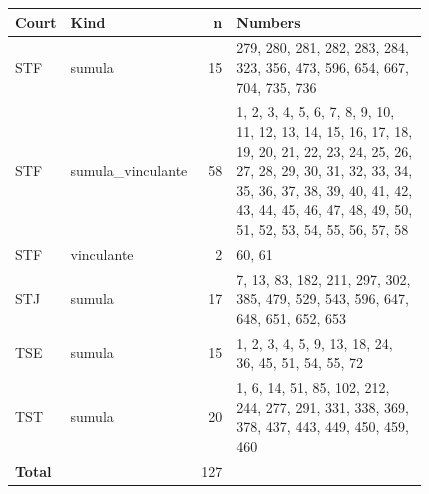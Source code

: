 \begin{longtable}{p{0.12\linewidth}p{0.15\linewidth}r p{0.55\linewidth}}
\hline\textbf{Court} & \textbf{Kind} & \textbf{n} & \textbf{Numbers}\\\hline\endhead
STF & sumula & 15 & 279, 280, 281, 282, 283, 284, 323, 356, 473, 596, 654, 667, 704, 735, 736\\
STF & sumula\_vinculante & 58 & 1, 2, 3, 4, 5, 6, 7, 8, 9, 10, 11, 12, 13, 14, 15, 16, 17, 18, 19, 20, 21, 22, 23, 24, 25, 26, 27, 28, 29, 30, 31, 32, 33, 34, 35, 36, 37, 38, 39, 40, 41, 42, 43, 44, 45, 46, 47, 48, 49, 50, 51, 52, 53, 54, 55, 56, 57, 58\\
STF & vinculante & 2 & 60, 61\\
STJ & sumula & 17 & 7, 13, 83, 182, 211, 297, 302, 385, 479, 529, 543, 596, 647, 648, 651, 652, 653\\
TSE & sumula & 15 & 1, 2, 3, 4, 5, 9, 13, 18, 24, 36, 45, 51, 54, 55, 72\\
TST & sumula & 20 & 1, 6, 14, 51, 85, 102, 212, 244, 277, 291, 331, 338, 369, 378, 437, 443, 449, 450, 459, 460\\
\hline\textbf{Total} & & 127 & \\\hline
\end{longtable}
